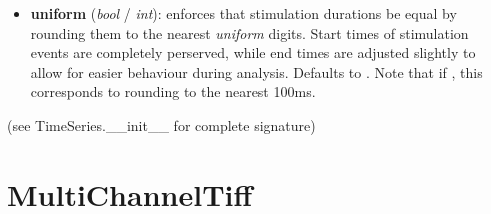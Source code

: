 \documentclass[letterpaper,10pt,english]{sphinxmanual}
\begin{document}
\begin{fulllineitems}
\begin{fulllineitems}
\begin{description}
\begin{itemize}
\item {} 
\textbf{uniform} (\emph{bool} / \emph{int}): enforces that stimulation durations be equal by rounding them to the nearest \emph{uniform} digits. Start times of stimulation events are completely perserved, while end times are adjusted slightly to allow for easier behaviour during analysis. Defaults to . Note that if , this corresponds to rounding to the nearest 100ms.

\end{itemize}

\end{description}

(see TimeSeries.\_\_init\_\_ for complete signature)

\end{fulllineitems}


\end{fulllineitems}



\section{MultiChannelTiff}
\label{data_structures:multichanneltiff}
\end{document}
